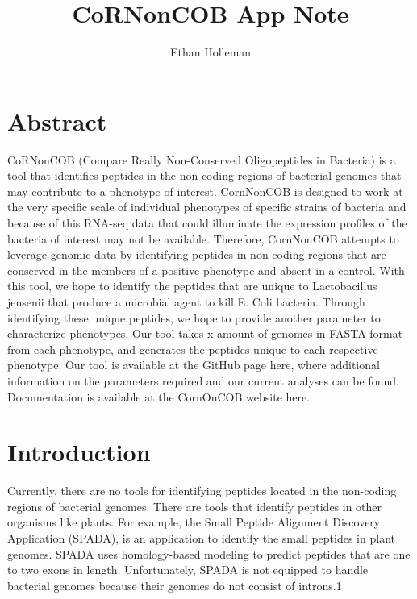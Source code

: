 \documentclass{article}
\begin{document}
\title{CoRNonCOB App Note
	   \medskip \large}
\author{Ethan Holleman}

\maketitle

\newpage

\section{Abstract}
CoRNonCOB (Compare Really Non-Conserved Oligopeptides in Bacteria) is a tool that identifies peptides in the non-coding regions of bacterial genomes that may contribute to a phenotype of interest. CornNonCOB is designed to work at the very specific scale of individual phenotypes of specific strains of bacteria and because of this RNA-seq data that could illuminate the expression profiles of the bacteria of interest may not be available. Therefore, CornNonCOB attempts to leverage genomic data by identifying peptides in non-coding regions that are conserved in the members of a positive phenotype and absent in a control. With this tool, we hope to identify the peptides that are unique to Lactobacillus jensenii that produce a microbial agent to kill E. Coli bacteria. Through identifying these unique peptides, we hope to provide another parameter to characterize phenotypes. Our tool takes x amount of genomes in FASTA format  from each phenotype, and generates the peptides unique to each respective phenotype. Our tool is available at the GitHub page here, where additional information on the parameters required and our current analyses can be found. Documentation is available at the CornOnCOB website here.

\section{Introduction}
Currently, there are no tools for identifying peptides located in the non-coding regions of bacterial genomes. There are tools that identify peptides in other organisms like plants. For example, the Small Peptide Alignment Discovery Application (SPADA), is an application to identify the small peptides in plant genomes. SPADA uses homology-based modeling to predict peptides that are one to two exons in length. Unfortunately, SPADA is not equipped to handle bacterial genomes because their genomes do not consist of introns.1 
\\
\end{document}
